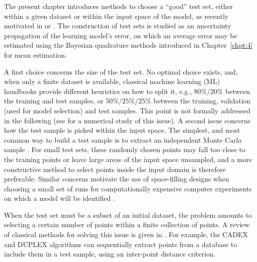 The present chapter introduces methods to choose a ``good'' test set, either within a given dataset or within the input space of the model, as recently motivated in \citet{ioo21} or \citet{josvak21}. 
The construction of test sets is studied as an uncertainty propagation of the learning model's error, on which an average error may be estimated using the Bayesian quadrature methods introduced in Chapter~\ref{chpt:4} for mean estimation. 

A first choice concerns the size of the test set. No optimal choice exists, and, when only a finite dataset is available, classical machine learning (ML) handbooks \citep{tibshirani_2009,gooben16} provide different heuristics on how to split it, e.g., $80\% / 20\%$ between the training and test samples, or $50\% / 25\% / 25\%$ between the training, validation (used for model selection) and test samples. 
This point is not formally addressed in the following (see \citealp{xugoo18} for a numerical study of this issue).   
A second issue concerns how the test sample is picked within the input space. The simplest, and most common way to build a test sample is to extract an independent Monte Carlo sample \citep{tibshirani_2009}. 
For small test sets, these randomly chosen points may fall too close to the training points or leave large areas of the input space unsampled, and a more constructive method to select points inside the input domain is therefore preferable. 
Similar concerns motivate the use of space-filling designs when choosing a small set of runs for computationally expensive computer experiments on which a model will be identified \citep{fanli06,pronzato_2012}. 

When the test set must be a subset of an initial dataset, the problem amounts to selecting a certain number of points within a finite collection of points. 
A review of classical methods for solving this issue is given in \citet{borjir12}. 
For example, the CADEX \citep{kensto69} and DUPLEX \citep{sne77} algorithms can sequentially extract points from a database to include them in a test sample, using an inter-point distance criterion. 

